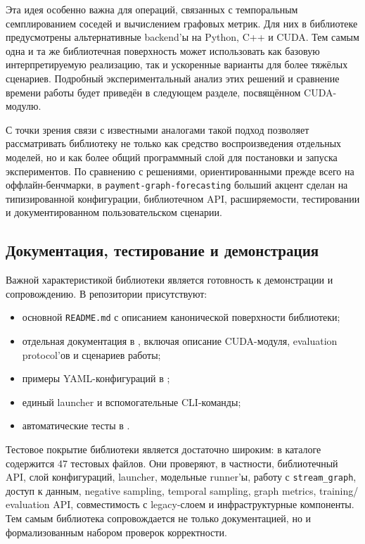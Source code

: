 \documentclass[a4paper,12pt]{extarticle}
\begin{document}
  Эта идея особенно важна для операций, связанных с темпоральным семплированием соседей и вычислением графовых метрик. Для них в библиотеке предусмотрены
  альтернативные backend'ы на Python, C++ и CUDA. Тем самым одна и та же библиотечная поверхность может использовать как базовую интерпретируемую реализацию, так и
  ускоренные варианты для более тяжёлых сценариев. Подробный экспериментальный анализ этих решений и сравнение времени работы будет приведён в следующем разделе,
  посвящённом CUDA-модулю.

  С точки зрения связи с известными аналогами такой подход позволяет рассматривать библиотеку не только как средство воспроизведения отдельных моделей, но и как
  более общий программный слой для постановки и запуска экспериментов. По сравнению с решениями, ориентированными прежде всего на оффлайн-бенчмарки, в
  \texttt{payment-graph-forecasting} больший акцент сделан на типизированной конфигурации, библиотечном API, расширяемости, тестировании и документированном
  пользовательском сценарии.

  \subsection{Документация, тестирование и демонстрация}

  Важной характеристикой библиотеки является готовность к демонстрации и сопровождению. В репозитории присутствуют:
  \begin{itemize}
      \item основной \texttt{README.md} с описанием канонической поверхности библиотеки;
      \item отдельная документация в , включая описание CUDA-модуля, evaluation protocol'ов и сценариев работы;
      \item примеры YAML-конфигураций в ;
      \item единый launcher и вспомогательные CLI-команды;
      \item автоматические тесты в .
  \end{itemize}

  Тестовое покрытие библиотеки является достаточно широким: в каталоге  содержится 47 тестовых файлов. Они проверяют, в частности, библиотечный API,
  слой конфигураций, launcher, модельные runner'ы, работу с \texttt{stream\_graph}, доступ к данным, negative sampling, temporal sampling, graph metrics, training/
  evaluation API, совместимость с legacy-слоем и инфраструктурные компоненты. Тем самым библиотека сопровождается не только документацией, но и формализованным
  набором проверок корректности.
\end{document}
